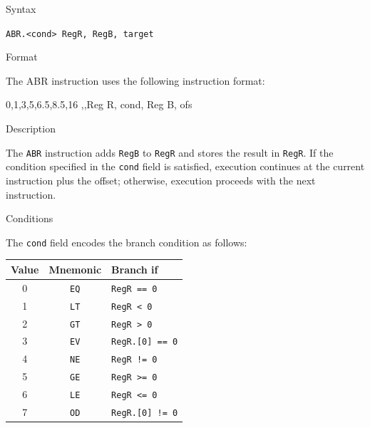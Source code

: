%
%
\pagebreak
{}

\begin{iPageDescEntry}{Syntax}

	\texttt{ABR.<cond> RegR, RegB, target}
	
\end{iPageDescEntry}

\begin{iPageDescEntry}{Format}

The ABR instruction uses the following instruction format:
	
\begin{flushleft}
\drawInstrFormat
  	{0,1,3,5,6.5,8.5,16}
  	{\OpCodeGrpBR,\OpCodeABR,Reg R, cond, Reg B, ofs }
\end{flushleft}
\end{iPageDescEntry}

\begin{iPageDescEntry}{Description}

The \texttt{ABR} instruction adds \texttt{RegB} to \texttt{RegR} and stores the result in \texttt{RegR}. If the condition specified in the \texttt{cond} field is satisfied, execution continues at the current instruction plus the offset; otherwise, execution proceeds with the next instruction.

\end{iPageDescEntry}

\begin{iPageDescEntry}{Conditions}

The \texttt{cond} field encodes the branch condition as follows:

\begin{flushleft}
\begin{tabular}{|c|c|l|}
\hline
\textbf{Value} & \textbf{Mnemonic} & \textbf{Branch if} \\ \hline
0 & \texttt{EQ} & \texttt{RegR == 0} \\ \hline
1 & \texttt{LT} & \texttt{RegR <  0}  \\ \hline
2 & \texttt{GT} & \texttt{RegR >  0} \\ \hline
3 & \texttt{EV} & \texttt{RegR.[0] == 0} \\ \hline
4 & \texttt{NE} & \texttt{RegR != 0} \\ \hline
5 & \texttt{GE} & \texttt{RegR >= 0} \\ \hline
6 & \texttt{LE} & \texttt{RegR <= 0}  \\ \hline
7 & \texttt{OD} & \texttt{RegR.[0] != 0} \\ \hline
\end{tabular}
\end{flushleft}

\end{iPageDescEntry}

